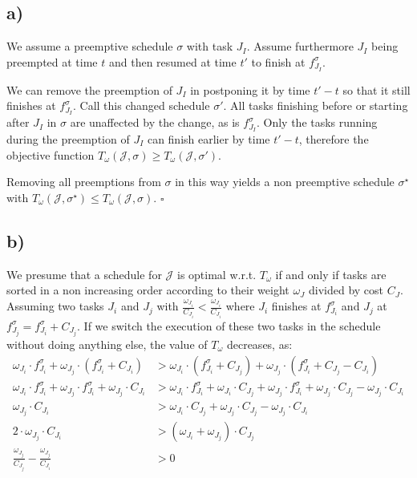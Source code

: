 \documentclass[12pt]{article}
\begin{document}
\subsection*{a)}
We assume a preemptive schedule $\sigma$ with task $J_I$. Assume furthermore $J_I$ being preempted at time $t$ and then resumed at time $t'$ to finish at $f^\sigma_{J_I}$. 

We can remove the preemption of $J_I$ in postponing it by time $t' - t$ so that it still finishes at $f^\sigma_{J_I}$. Call this changed schedule $\sigma'$. All tasks finishing before or starting after $J_I$ in $\sigma$ are unaffected by the change, as is $f^\sigma_{J_I}$. 
Only the tasks running during the preemption of $J_I$ can finish earlier by time $t' - t$, therefore the objective function $T_\omega (\mathcal{J}, \sigma) \geq T_\omega (\mathcal{J}, \sigma')$. 

Removing all preemptions from $\sigma$ in this way yields a non preemptive schedule $\sigma^\star$ with $T_\omega (\mathcal{J}, \sigma^\star) \leq T_\omega (\mathcal{J}, \sigma)$. $\square$

\subsection*{b)}
We presume that a schedule for $\mathcal{J}$ is optimal w.r.t. $T_\omega$ if and only if tasks are sorted in a non increasing order according to their weight $\omega_J$ divided by cost $C_J$.
Assuming two tasks $J_i$ and $J_j$ with $\frac{\omega_{J_i}}{C_{J_i}} < \frac{\omega_{J_i}}{C_{J_i}}$ where $J_i$ finishes at $f^\sigma_{J_i}$ and $J_j$ at $f^\sigma_{J_j} = f^\sigma_{J_i} + C_{J_j}$.
If we switch the execution of these two tasks in the schedule without doing anything else, the value of $T_\omega$ decreases, as:
\begin{align*}
\omega_{J_i} \cdot f^\sigma_{J_i} + \omega_{J_j} \cdot (f^\sigma_{J_i} + C_{J_i}) &> \omega_{J_i} \cdot (f^\sigma_{J_i} + C_{J_j}) + \omega_{J_j} \cdot (f^\sigma_{J_i} + C_{J_j} - C_{J_i} ) \\
\omega_{J_i} \cdot f^\sigma_{J_i} + \omega_{J_j} \cdot f^\sigma_{J_i} + \omega_{J_j} \cdot C_{J_i} &> \omega_{J_i} \cdot f^\sigma_{J_i} + \omega_{J_i} \cdot C_{J_j} + \omega_{J_j} \cdot f^\sigma_{J_i} + \omega_{J_j} \cdot C_{J_j} - \omega_{J_j} \cdot C_{J_i} \\
\omega_{J_j} \cdot C_{J_i} &> \omega_{J_i} \cdot C_{J_j} + \omega_{J_j} \cdot C_{J_j} - \omega_{J_j} \cdot C_{J_i} \\
2 \cdot \omega_{J_j} \cdot C_{J_i} &> ( \omega_{J_i} +  \omega_{J_j} ) \cdot C_{J_j} \\
\frac{\omega_{J_j}}{C_{J_j}} - \frac{\omega_{J_j}}{C_{J_i}} &> 0 \\
\end{align*}
\end{document}
